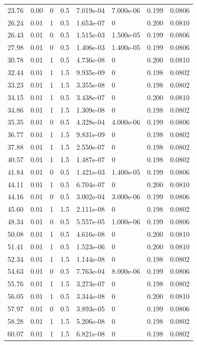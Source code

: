 \documentclass[preview]{standalone}
\begin{document}
{{\begin{tabular}{L{1.2cm}C{1.2cm} C{0.3cm}C{0.5cm} C{1.4cm}C{1.4cm} C{1.4cm}C{1.4cm}}
  23.76  &  0.00  & 0     & 0.5 &  7.019e-04  & 7.000e-06  & 0.199 &  0.0806   \\ 
  26.24  &  0.01  & 1     & 0.5 &  1.653e-07  & 0  & 0.200 &  0.0810   \\ 
  26.43  &  0.01  & 0     & 0.5 &  1.515e-03  & 1.500e-05  & 0.199 &  0.0806   \\ 
  27.98  &  0.01  & 0     & 0.5 &  1.406e-03  & 1.400e-05  & 0.199 &  0.0806   \\ 
  30.78  &  0.01  & 1     & 0.5 &  4.736e-08  & 0  & 0.200 &  0.0810   \\ 
  32.44  &  0.01  & 1     & 1.5 &  9.935e-09  & 0  & 0.198 &  0.0802   \\ 
  33.23  &  0.01  & 1     & 1.5 &  3.355e-08  & 0  & 0.198 &  0.0802   \\ 
  34.15  &  0.01  & 1     & 0.5 &  3.438e-07  & 0  & 0.200 &  0.0810   \\ 
  34.86  &  0.01  & 1     & 1.5 &  1.309e-08  & 0  & 0.198 &  0.0802   \\ 
  35.35  &  0.01  & 0     & 0.5 &  4.328e-04  & 4.000e-06  & 0.199 &  0.0806   \\ 
  36.77  &  0.01  & 1     & 1.5 &  9.831e-09  & 0  & 0.198 &  0.0802   \\ 
  37.88  &  0.01  & 1     & 1.5 &  2.550e-07  & 0  & 0.198 &  0.0802   \\ 
  40.57  &  0.01  & 1     & 1.5 &  1.487e-07  & 0  & 0.198 &  0.0802   \\ 
  41.84  &  0.01  & 0     & 0.5 &  1.421e-03  & 1.400e-05  & 0.199 &  0.0806   \\ 
  44.11  &  0.01  & 1     & 0.5 &  6.704e-07  & 0  & 0.200 &  0.0810   \\ 
  44.16  &  0.01  & 0     & 0.5 &  3.002e-04  & 3.000e-06  & 0.199 &  0.0806   \\ 
  45.60  &  0.01  & 1     & 1.5 &  2.111e-08  & 0  & 0.198 &  0.0802   \\ 
  48.34  &  0.01  & 0     & 0.5 &  5.557e-05  & 1.000e-06  & 0.199 &  0.0806   \\ 
  50.08  &  0.01  & 1     & 0.5 &  4.616e-08  & 0  & 0.200 &  0.0810   \\ 
  51.41  &  0.01  & 1     & 0.5 &  1.523e-06  & 0  & 0.200 &  0.0810   \\ 
  52.34  &  0.01  & 1     & 1.5 &  1.144e-08  & 0  & 0.198 &  0.0802   \\ 
  54.63  &  0.01  & 0     & 0.5 &  7.763e-04  & 8.000e-06  & 0.199 &  0.0806   \\ 
  55.76  &  0.01  & 1     & 1.5 &  3.273e-07  & 0  & 0.198 &  0.0802   \\ 
  56.05  &  0.01  & 1     & 0.5 &  3.344e-08  & 0  & 0.200 &  0.0810   \\ 
  57.97  &  0.01  & 0     & 0.5 &  3.893e-05  & 0  & 0.199 &  0.0806   \\ 
  58.28  &  0.01  & 1     & 1.5 &  5.206e-08  & 0  & 0.198 &  0.0802   \\ 
  60.07  &  0.01  & 1     & 1.5 &  6.821e-08  & 0  & 0.198 &  0.0802   \\ 
\hline 
\end{tabular} 

}}
\end{document}
